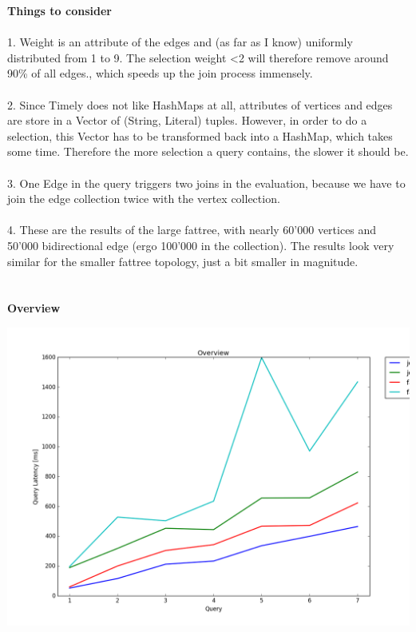 \documentclass[11pt,singlecolumn]{scrartcl}
\begin{document}
\textbf{Things to consider}\\\\
1. Weight is an attribute of the edges and (as far as I know) uniformly distributed from 1 to 9. The selection weight \textless 2 will therefore remove around 90\% of all edges., which speeds up the join process immensely.\\\\
2. Since Timely does not like HashMaps at all, attributes of vertices and edges are store in a Vector of (String, Literal) tuples. However, in order to do a selection, this Vector has to be transformed back into a HashMap, which takes some time. Therefore  the more selection a query contains, the slower it should be.\\\\
3. One Edge in the query triggers two joins in the evaluation,  because we have to join the edge collection twice with the vertex collection.\\\\
4. These are the results of the large fattree, with nearly 60'000 vertices and 50'000 bidirectional edge (ergo 100'000 in the collection). The results look very similar for the smaller fattree topology, just a bit smaller in magnitude.\\\\\\
\textbf{Overview}


\includegraphics[width=1\textwidth]{overview3}

\clearpage

\clearpage
\end{document}
